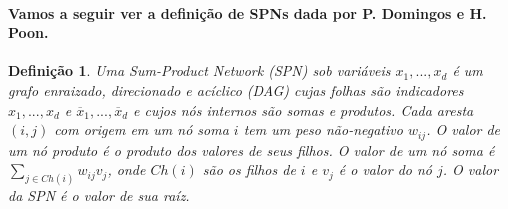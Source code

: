 \documentclass[a4paper,10pt]{article}
\theoremstyle{plain}
\newtheorem{spn-def}{Definição}
\begin{document}
\paragraph{
  Vamos a seguir ver a definição de SPNs dada por P. Domingos e H. Poon\cite{poon-domingos}.
}

\begin{spn-def} Uma Sum-Product Network (SPN) sob variáveis $x_1,...,x_d$ é um grafo enraizado,
  direcionado e acíclico (DAG) cujas folhas são indicadores $x_1,...,x_d$ e $\overline{x}_1,...,
  \overline{x}_d$ e cujos nós internos são somas e produtos. Cada aresta $(i,j)$ com origem em um
  nó soma $i$ tem um peso não-negativo $w_{ij}$. O valor de um nó produto é o produto dos valores
  de seus filhos. O valor de um nó soma é $\sum_{j \in Ch(i)} w_{ij}v_j$, onde $Ch(i)$ são os
  filhos de $i$ e $v_j$ é o valor do nó $j$. O valor da SPN é o valor de sua raíz.
\end{spn-def}

\begin{figure}[h]
\end{figure}
\end{document}
